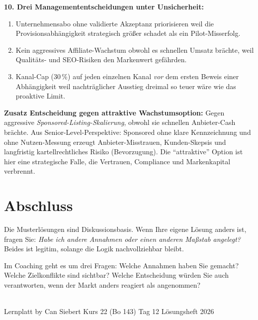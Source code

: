 \documentclass[11pt,a4paper,oneside]{article}
\begin{document}
\begin{loesungbox}
\textbf{10. Drei Managemententscheidungen unter Unsicherheit:}
\begin{enumerate}
  \item Unternehmensabo ohne validierte Akzeptanz priorisieren \textendash{} weil die Provisionsabhängigkeit strategisch größer schadet als ein Pilot-Misserfolg.
  \item Kein aggressives Affiliate-Wachstum \textendash{} obwohl es schnellen Umsatz brächte, weil Qualitäts- und SEO-Risiken den Markenwert gefährden.
  \item Kanal-Cap (30\,\%) auf jeden einzelnen Kanal \emph{vor} dem ersten Beweis einer Abhängigkeit \textendash{} weil nachträglicher Ausstieg dreimal so teuer wäre wie das proaktive Limit.
\end{enumerate}

\smallskip
\textbf{Zusatz \textendash{} Entscheidung gegen attraktive Wachstumsoption:} Gegen aggressive \emph{Sponsored-Listing-Skalierung}, obwohl sie schnellen Anbieter-Cash brächte. Aus Senior-Level-Perspektive: Sponsored ohne klare Kennzeichnung und ohne Nutzen-Messung erzeugt Anbieter-Misstrauen, Kunden-Skepsis und langfristig kartellrechtliches Risiko (Bevorzugung). Die ``attraktive'' Option ist hier eine strategische Falle, die Vertrauen, Compliance und Markenkapital verbrennt.
\end{loesungbox}

\clearpage

\section*{Abschluss}
\thispagestyle{plain}

\noindent Die Musterlösungen sind Diskussionsbasis. Wenn Ihre eigene Lösung anders ist, fragen Sie: \emph{Habe ich andere Annahmen \textendash{} oder einen anderen Maßstab angelegt?} Beides ist legitim, solange die Logik nachvollziehbar bleibt.

\medskip
\begin{infobox}
Im Coaching geht es um drei Fragen: Welche Annahmen haben Sie gemacht? Welche Zielkonflikte sind sichtbar? Welche Entscheidung würden Sie auch verantworten, wenn der Markt anders reagiert als angenommen?
\end{infobox}

\vspace{1cm}
\noindent{\color{lpAccent}\rule{\linewidth}{0.6pt}}\\[4pt]
{\footnotesize\sffamily\color{lpGray}Lernplatt \textperiodcentered{} by Can Siebert \textperiodcentered{} Kurs 22 (Bo 143) \textperiodcentered{} Tag 12 \textperiodcentered{} Lösungsheft \textperiodcentered{} \textcopyright{} 2026}
\end{document}

